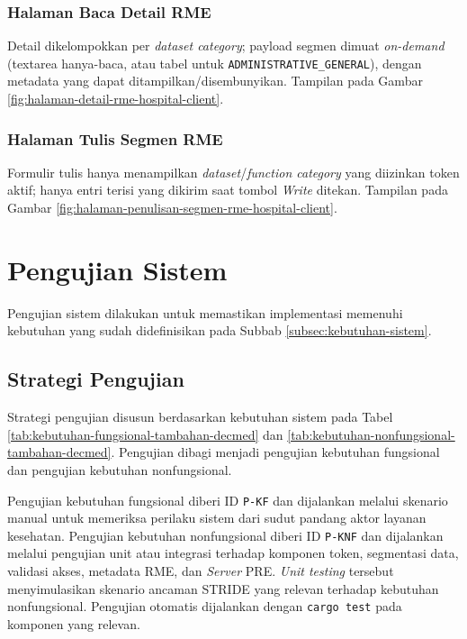 \documentclass[bahasa, 12pt, a4paper, onecolumn, oneside, final]{report}
\begin{document}
\subsubsection{Halaman Baca Detail RME}
\label{subsubsec:halaman-baca-detail-rme-hospital-client}

Detail dikelompokkan per \textit{dataset category}; payload segmen dimuat \textit{on-demand} (textarea hanya-baca, atau tabel untuk \texttt{ADMINISTRATIVE\_GENERAL}), dengan metadata yang dapat ditampilkan/disembunyikan. Tampilan pada Gambar \ref{fig:halaman-detail-rme-hospital-client}.

\subsubsection{Halaman Tulis Segmen RME}
\label{subsubsec:halaman-penulisan-segmen-rme-hospital-client}

Formulir tulis hanya menampilkan \textit{dataset}/\textit{function category} yang diizinkan token aktif; hanya entri terisi yang dikirim saat tombol \textit{Write} ditekan. Tampilan pada Gambar \ref{fig:halaman-penulisan-segmen-rme-hospital-client}.
\section{Pengujian Sistem}
\label{sec:pengujian-sistem}

Pengujian sistem dilakukan untuk memastikan implementasi memenuhi kebutuhan yang sudah didefinisikan pada Subbab \ref{subsec:kebutuhan-sistem}.

\subsection{Strategi Pengujian}
\label{subsec:strategi-pengujian}

Strategi pengujian disusun berdasarkan kebutuhan sistem pada Tabel \ref{tab:kebutuhan-fungsional-tambahan-decmed} dan \ref{tab:kebutuhan-nonfungsional-tambahan-decmed}. Pengujian dibagi menjadi pengujian kebutuhan fungsional dan pengujian kebutuhan nonfungsional.

Pengujian kebutuhan fungsional diberi ID \texttt{P-KF} dan dijalankan melalui skenario manual untuk memeriksa perilaku sistem dari sudut pandang aktor layanan kesehatan. Pengujian kebutuhan nonfungsional diberi ID \texttt{P-KNF} dan dijalankan melalui pengujian unit atau integrasi terhadap komponen token, segmentasi data, validasi akses, metadata RME, dan \textit{Server} PRE. \textit{Unit testing} tersebut menyimulasikan skenario ancaman STRIDE yang relevan terhadap kebutuhan nonfungsional. Pengujian otomatis dijalankan dengan \texttt{cargo test} pada komponen yang relevan.
\end{document}
